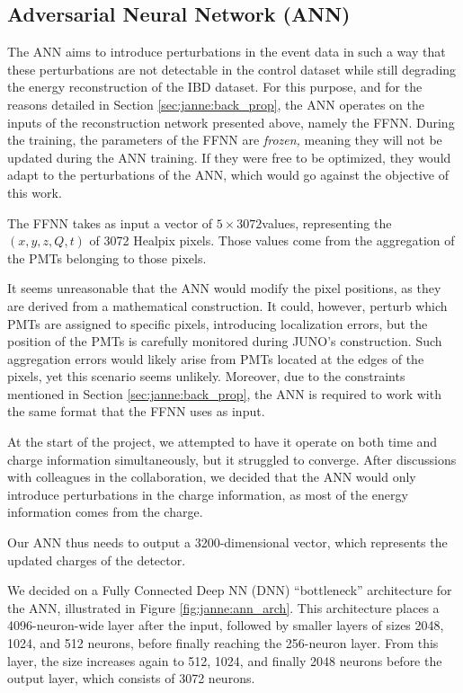 \documentclass[../main.tex]{subfiles}
\begin{document}
\subsection{Adversarial Neural Network (ANN)}
\label{sec:janne:arch:ann}

The ANN aims to introduce perturbations in the event data in such a way that these perturbations are not detectable in the control dataset while still degrading the energy reconstruction of the IBD dataset. For this purpose, and for the reasons detailed in Section \ref{sec:janne:back_prop}, the ANN operates on the inputs of the reconstruction network presented above, namely the FFNN. During the training, the parameters of the FFNN are \textit{frozen,} meaning they will not be updated during the ANN training. If they were free to be optimized, they would adapt to the perturbations of the ANN, which would go against the objective of this work.

The FFNN takes as input a vector of $5 \times 3072$values, representing the $(x,y,z,Q,t)$ of 3072 Healpix pixels. Those values come from the aggregation of the PMTs belonging to those pixels.

It seems unreasonable that the ANN would modify the pixel positions, as they are derived from a mathematical construction. It could, however, perturb which PMTs are assigned to specific pixels, introducing localization errors, but the position of the PMTs is carefully monitored during JUNO’s construction. Such aggregation errors would likely arise from PMTs located at the edges of the pixels, yet this scenario seems unlikely. Moreover, due to the constraints mentioned in Section \ref{sec:janne:back_prop}, the ANN is required to work with the same format that the FFNN uses as input.


At the start of the project, we attempted to have it operate on both time and charge information simultaneously, but it struggled to converge. After discussions with colleagues in the collaboration, we decided that the ANN would only introduce perturbations in the charge information, as most of the energy information comes from the charge.

Our ANN thus needs to output a 3200-dimensional vector, which represents the updated charges of the detector.

We decided on a Fully Connected Deep NN (DNN) ``bottleneck'' architecture for the ANN, illustrated in Figure \ref{fig:janne:ann_arch}. This architecture places a 4096-neuron-wide layer after the input, followed by smaller layers of sizes 2048, 1024, and 512 neurons, before finally reaching the 256-neuron layer. From this layer, the size increases again to 512, 1024, and finally 2048 neurons before the output layer, which consists of 3072 neurons.
\end{document}
